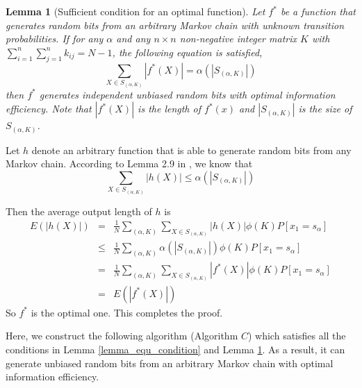 \documentclass[journal]{IEEEtran}
\newtheorem{Lemma}[Theorem]{Lemma}
\begin{document}
\begin{Lemma}[Sufficient condition for an optimal function]
Let $f^*$ be a function that generates random bits from an arbitrary Markov chain with unknown transition probabilities. If for any $\alpha$ and any $n\times n$ non-negative integer matrix $K$ with $\sum_{i=1}^n\sum_{j=1}^n k_{ij}=N-1$, the following equation is satisfied,
$$\sum_{X\in S_{(\alpha,K)}}|f^*(X)|=\alpha(|S_{(\alpha,K)}|)$$
then $f^*$ generates independent unbiased random bits with optimal information efficiency. Note that $|f^*(X)|$ is the length of $f^*(x)$ and $|S_{(\alpha,K)}|$ is the size of $S_{(\alpha,K)}$. \label{lemma_conditionForOptimal}
\end{Lemma}

\proof
Let $h$ denote an arbitrary function that is able to generate random bits from any Markov chain. According to Lemma 2.9 in \cite{Pae2005}, we know that
$$ \sum_{X\in S_{(\alpha,K)}}|h(X)| \leq \alpha(|S_{(\alpha,K)}|)$$

Then the average output length of $h$ is
\begin{eqnarray*}
   E(|h(X)|)&=& \frac{1}{N}\sum_{(\alpha,K)}\sum_{X\in S_{(\alpha,K)}}|h(X)|\phi(K)P[x_1=s_\alpha] \\
   &\leq & \frac{1}{N}\sum_{(\alpha,K)} \alpha(|S_{(\alpha,K)}|) \phi(K)P[x_1=s_\alpha] \\
   &=& \frac{1}{N}\sum_{(\alpha,K)} \sum_{X\in S_{(\alpha,K)}}|f^*(X)| \phi(K)P[x_1=s_\alpha]\\
   &=& E(|f^*(X)|)
\end{eqnarray*}
So $f^*$ is the optimal one. This completes the proof.
\hfill\QED

Here, we construct the following algorithm (Algorithm $C$) which satisfies all the conditions in Lemma \ref{lemma_equ_condition} and Lemma \ref{lemma_conditionForOptimal}.
As a result, it can generate unbiased random bits from an arbitrary Markov chain with optimal information efficiency.
\end{document}
